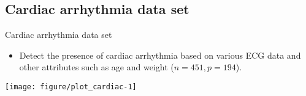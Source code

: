 \documentclass{beamer}\usepackage[]{graphicx}\usepackage[]{color}
\makeatletter
\def\maxwidth{ %
  \ifdim\Gin@nat@width>\linewidth
    \linewidth
  \else
    \Gin@nat@width
  \fi
}
\newenvironment{knitrout}{}{} %
\makeatother
\begin{document}
\subsection*{Cardiac arrhythmia data set}

\begin{frame}[fragile]{Cardiac arrhythmia data set}
\vspace{-20pt}
\begin{itemize}
\item Detect the presence of cardiac arrhythmia based on various ECG data and other attributes such as age and weight ($n = 451, p = 194$).
\end{itemize}

\begin{knitrout}\small
{}\color{fgcolor}

{\centering \texttt{[image: figure/plot\_cardiac-1]} 

}



\end{knitrout}
\end{frame}
\end{document}
